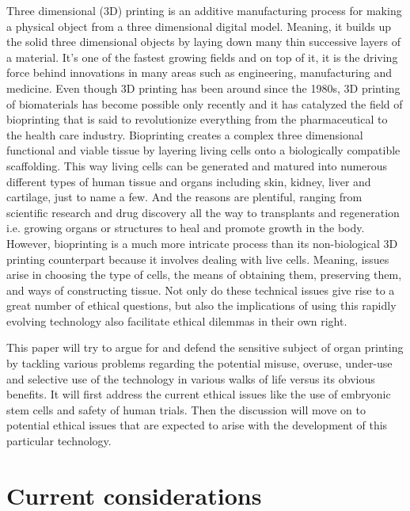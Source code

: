 \documentclass[12pt]{article} %
\begin{document}
Three dimensional (3D) printing is an additive manufacturing process for making a physical object from a three dimensional digital model. Meaning, it builds up the solid three dimensional objects by laying down many thin successive layers of a material. It's one of the fastest growing fields and on top of it, it is the driving force behind innovations in many areas such as engineering, manufacturing and medicine. Even though 3D printing has been around since the 1980s, 3D printing of biomaterials has become possible only recently and it has catalyzed the field of bioprinting that is said to revolutionize everything from the pharmaceutical to the health care industry. Bioprinting creates a complex three dimensional functional and viable tissue by layering living cells onto a biologically compatible scaffolding. This way living cells can be generated and matured into numerous different types of human tissue and organs including skin, kidney, liver and cartilage, just to name a few. And the reasons are plentiful, ranging from scientific research and drug discovery all the way to transplants and regeneration i.e. growing organs or structures to heal and promote growth in the body. 
However, bioprinting is a much more intricate process than its non-biological 3D printing counterpart because it involves dealing with live cells. Meaning, issues arise in choosing the type of cells, the means of obtaining them, preserving them, and ways of constructing tissue. Not only do these technical issues give rise to a great number of ethical questions, but also the implications of using this rapidly evolving technology also facilitate ethical dilemmas in their own right. 

This paper will try to argue for and defend the sensitive subject of organ printing by tackling various problems regarding the potential misuse, overuse, under-use and selective use of the technology in various walks of life versus its obvious benefits. It will first address the current ethical issues like the use of embryonic stem cells and safety of human trials. Then the discussion will move on to potential ethical issues that are expected to arise with the development of this particular technology.

\newpage


\section{Current considerations} %
\end{document}

